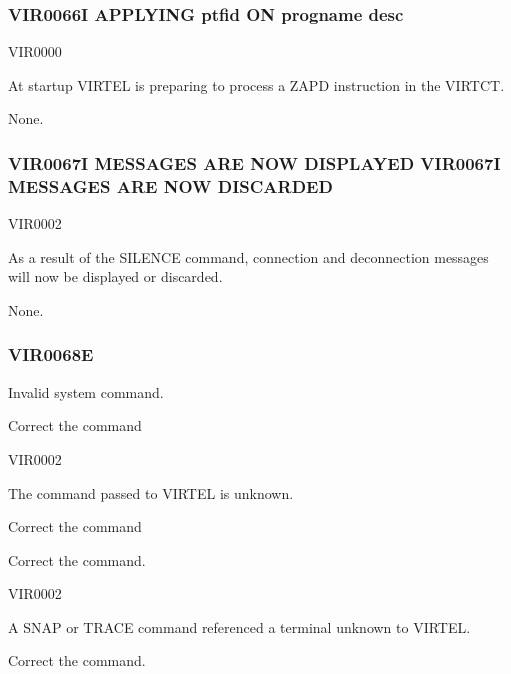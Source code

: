 \documentclass[letterpaper,10pt,english]{sphinxmanual}
\begin{document}
\subsubsection{VIR0066I APPLYING ptfid ON progname desc}
\label{\detokenize{messages:vir0066i-applying-ptfid-on-progname-desc}}\begin{description}
\sphinxAtStartPar
VIR0000

\sphinxAtStartPar
At startup VIRTEL is preparing to process a ZAPD instruction in the VIRTCT.

\sphinxAtStartPar
None.

\end{description}


\subsubsection{VIR0067I MESSAGES ARE NOW DISPLAYED VIR0067I MESSAGES ARE NOW DISCARDED}
\label{\detokenize{messages:vir0067i-messages-are-now-displayed-vir0067i-messages-are-now-discarded}}\begin{description}
\sphinxAtStartPar
VIR0002

\sphinxAtStartPar
As a result of the SILENCE command, connection and deconnection messages will now be displayed or discarded.

\sphinxAtStartPar
None.

\end{description}


\subsubsection{VIR0068E}
\label{\detokenize{messages:vir0068e}}
\sphinxAtStartPar
Invalid system command.
\begin{description}
\sphinxAtStartPar
Correct the command

\sphinxAtStartPar
VIR0002

\sphinxAtStartPar
The command passed to VIRTEL is unknown.

\sphinxAtStartPar
Correct the command

\sphinxAtStartPar
Correct the command.

\sphinxAtStartPar
VIR0002

\sphinxAtStartPar
A SNAP or TRACE command referenced a terminal unknown to VIRTEL.

\sphinxAtStartPar
Correct the command.

\end{description}
\end{document}
